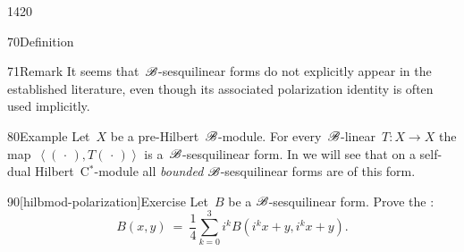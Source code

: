 \begin{parsec}{1420}
\begin{point}{70}{Definition}
\begin{point}{71}{Remark}
It seems that~$\mathscr{B}$-sesquilinear forms do not explicitly appear
    in the established literature,
    even though its associated polarization identity
    is often used implicitly.
\end{point}
\end{point}
\begin{point}{80}{Example}%
Let~$X$ be a pre-Hilbert~$\mathscr{B}$-module.
For every~$\mathscr{B}$-linear~$T\colon X \to X$
    the map~$\left<(\,\cdot\,), T (\,\cdot\,)\right>$
    is a~$\mathscr{B}$-sesquilinear form.
In 
    we will see that on a self-dual Hilbert~C$^*$-module
    all \emph{bounded}
    $\mathscr{B}$-sesquilinear forms
    are of this form.
\end{point}
\begin{point}{90}[hilbmod-polarization]{Exercise}%
Let~$B$ be a $\mathscr{B}$-sesquilinear form.
Prove the :
\begin{equation*}
    B(x,y) \ =\  \frac{1}{4} \sum_{k=0}^3 i^k B(i^k x + y, i^k x + y).
\end{equation*}
\end{point}
\spacingfix{}
\end{parsec}

